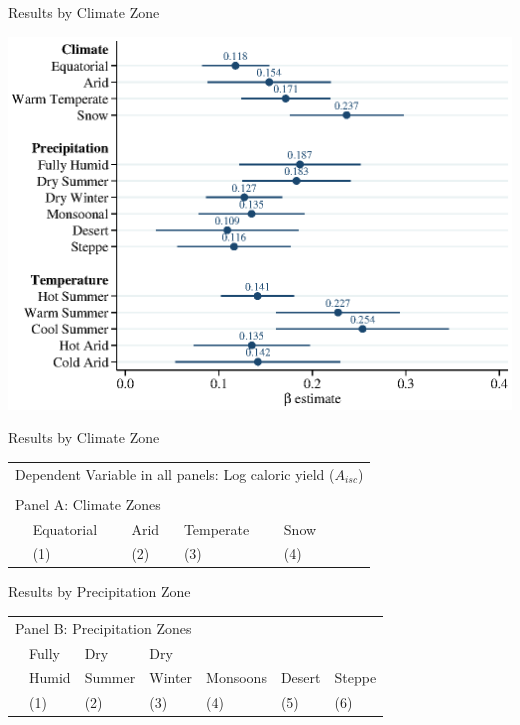 \documentclass[10pt, xcolor=dvipsnames]{beamer}
\begin{document}
\begin{frame}{Results by Climate Zone}
\begin{center}
\includegraphics[width=.8\textwidth]{fig_coef_kg.eps}
\end{center}
\end{frame}

\begin{frame}{Results by Climate Zone}

{\scriptsize
\begin{tabularx}{\textwidth}{lXXXXXX}
\midrule
\multicolumn{7}{l}{Dependent Variable in all panels: Log caloric yield ($A_{isc}$)} \\ \\
\multicolumn{7}{l}{Panel A: Climate Zones} \\
 & Equatorial & Arid  & Temperate & Snow &     &   \\
 & (1) & (2) & (3) & (4) &  & \\
\midrule

\midrule
\end{tabularx}
}

\end{frame}

\begin{frame}{Results by Precipitation Zone}

{\scriptsize
\begin{tabularx}{\textwidth}{lXXXXXX}
\midrule
\multicolumn{7}{l}{Panel B: Precipitation Zones} \\
& Fully     & Dry         & Dry        &              &            & \\
& Humid & Summer  & Winter & Monsoons & Desert & Steppe   \\
 & (1) & (2) & (3) & (4) & (5) & (6) \\
\midrule

\midrule
\end{tabularx}
}

\end{frame}
\end{document}
